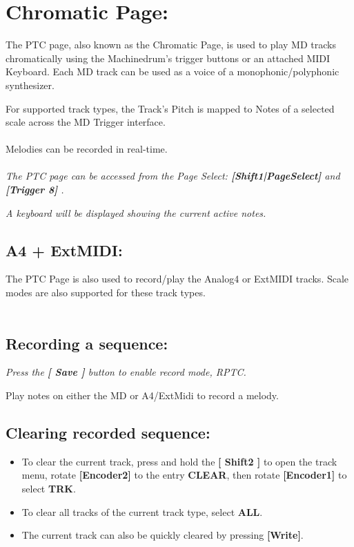 \chapter{Chromatic Page:}
The PTC page, also known as the Chromatic Page, is used to play MD tracks chromatically using the Machinedrum's trigger buttons or an attached MIDI Keyboard. Each MD track can be used as a voice of a monophonic/polyphonic synthesizer.


For supported track types, the Track’s Pitch is mapped to Notes of a selected scale across the MD Trigger interface.
\\\\
Melodies can be recorded in real-time.
\\\\
\textit{The PTC page can be accessed from the Page Select: \textbf{[Shift1|PageSelect]} and \textbf{[Trigger 8] }.}


\textit{A keyboard will be displayed showing the current active notes.}
\\



\section{A4 + ExtMIDI:}
The PTC Page is also used to record/play the Analog4 or ExtMIDI tracks. Scale modes are also supported for these track types.\\
\\
\section{Recording a sequence:}
\textit{Press the \textbf{[ Save ] }button to enable record mode, RPTC.\\}

Play notes on either the MD or A4/ExtMidi to record a melody.

\vspace{-0.3cm}

\section{Clearing recorded sequence:}
\begin{itemize}
\item To clear the current track, press and hold the\textbf{ [ Shift2 ]} to open the track menu, rotate \textbf{[Encoder2]} to the entry \textbf{CLEAR}, then rotate \textbf{[Encoder1]} to select \textbf{TRK}.
\item To clear all tracks of the current track type, select \textbf{ALL}.
\item The current track can also be quickly cleared by pressing \textbf{[Write]}.
\end{itemize}


